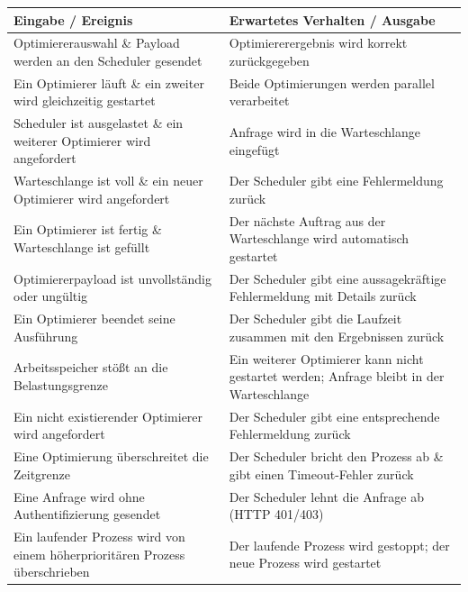 \begin{table}[H]
    \centering
    {\small
    \begin{tabular}{|p{}|p{}|}
        \hline
        \textbf{Eingabe / Ereignis} & \textbf{Erwartetes Verhalten / Ausgabe} \\
        \hline
        Optimiererauswahl \& Payload werden an den Scheduler gesendet & Optimiererergebnis wird korrekt zurückgegeben \\
        \hline
        Ein Optimierer läuft \& ein zweiter wird gleichzeitig gestartet & Beide Optimierungen werden parallel verarbeitet \\
        \hline
        Scheduler ist ausgelastet \& ein weiterer Optimierer wird angefordert & Anfrage wird in die Warteschlange eingefügt \\
        \hline
        Warteschlange ist voll \& ein neuer Optimierer wird angefordert & Der Scheduler gibt eine Fehlermeldung zurück \\
        \hline
        Ein Optimierer ist fertig \& Warteschlange ist gefüllt & Der nächste Auftrag aus der Warteschlange wird automatisch gestartet \\
        \hline
        Optimiererpayload ist unvollständig oder ungültig & Der Scheduler gibt eine aussagekräftige Fehlermeldung mit Details zurück \\
        \hline
        Ein Optimierer beendet seine Ausführung & Der Scheduler gibt die Laufzeit zusammen mit den Ergebnissen zurück \\
        \hline
        Arbeitsspeicher stößt an die Belastungsgrenze & Ein weiterer Optimierer kann nicht gestartet werden; Anfrage bleibt in der Warteschlange \\
        \hline
        Ein nicht existierender Optimierer wird angefordert & Der Scheduler gibt eine entsprechende Fehlermeldung zurück \\
        \hline
        Eine Optimierung überschreitet die Zeitgrenze & Der Scheduler bricht den Prozess ab \& gibt einen Timeout-Fehler zurück \\
        \hline
        Eine Anfrage wird ohne Authentifizierung gesendet & Der Scheduler lehnt die Anfrage ab (HTTP 401/403) \\
        \hline
        Ein laufender Prozess wird von einem höherprioritären Prozess überschrieben & Der laufende Prozess wird gestoppt; der neue Prozess wird gestartet \\
        \hline
    \end{tabular}
    }
\end{table}

